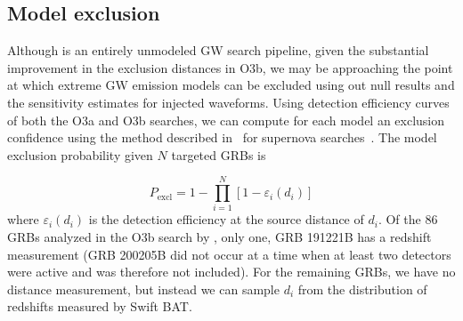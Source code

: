 %     


\subsection{Model exclusion}\label{sec:grb-o3b-models}

Although \xpip is an entirely unmodeled \ac{GW} search pipeline, given the substantial improvement in the exclusion distances in O3b, we may be approaching the point at which extreme GW emission models can be excluded using out null results and the sensitivity estimates for injected waveforms.
Using detection efficiency curves of both the O3a and O3b searches, we can compute for each model an exclusion confidence using the method described in~\citet{Kalmus_2013} for supernova searches~\citep{burst_o2}.
The model exclusion probability given $N$ targeted GRBs is

\begin{equation}
	P_{\text{excl}} = 1 - \prod_{i=1}^N \left[ 1 - \varepsilon_i(d_i) \right]
\end{equation}
where $\varepsilon_i(d_i)$ is the detection efficiency at the source distance of $d_i$.
Of the 86 GRBs analyzed in the O3b search by \xpip, only one, GRB 191221B has a redshift measurement (GRB 200205B did not occur at a time when at least two detectors were active and was therefore not included).
For the remaining GRBs, we have no distance measurement, but instead we can sample $d_i$ from the distribution of redshifts measured by Swift \ac{BAT}.

